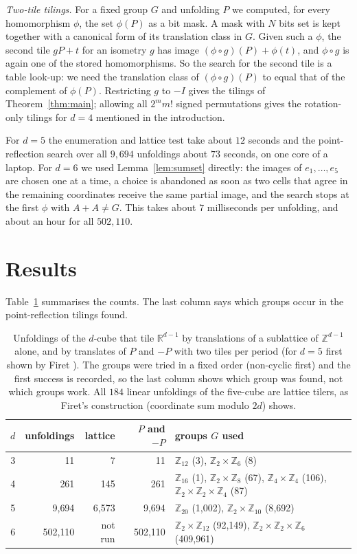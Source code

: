 \documentclass[11pt]{amsart}
\theoremstyle{definition}
\theoremstyle{remark}
\newcommand{\Z}{\mathbb{Z}}
\newcommand{\R}{\mathbb{R}}
\begin{document}
\emph{Two-tile tilings.} For a fixed group $G$ and unfolding $P$ we computed, for every homomorphism $\phi$, the set $\phi(P)$ as a bit mask. A mask with $N$ bits set is kept together with a canonical form of its translation class in $G$. Given such a $\phi$, the second tile $gP+t$ for an isometry $g$ has image $(\phi\circ g)(P)+\phi(t)$, and $\phi\circ g$ is again one of the stored homomorphisms. So the search for the second tile is a table look-up: we need the translation class of $(\phi\circ g)(P)$ to equal that of the complement of $\phi(P)$. Restricting $g$ to $-I$ gives the tilings of Theorem~\ref{thm:main}; allowing all $2^m m!$ signed permutations gives the rotation-only tilings for $d=4$ mentioned in the introduction.

For $d=5$ the enumeration and lattice test take about $12$ seconds and the point-reflection search over all $9{,}694$ unfoldings about $73$ seconds, on one core of a laptop. For $d=6$ we used Lemma~\ref{lem:sumset} directly: the images of $e_1,\dots,e_5$ are chosen one at a time, a choice is abandoned as soon as two cells that agree in the remaining coordinates receive the same partial image, and the search stops at the first $\phi$ with $A+A\ne G$. This takes about $7$ milliseconds per unfolding, and about an hour for all $502{,}110$.

\section{Results}\label{sec:results}

Table~\ref{tab:results} summarises the counts. The last column says which groups occur in the point-reflection tilings found.

\begin{table}[ht]
\centering\small
\begin{tabular}{rrrrp{5.2cm}}
\toprule
$d$ & unfoldings & lattice & $P$ and $-P$ & groups $G$ used\\
\midrule
3 & 11 & 7 & 11 & $\Z_{12}$ (3), $\Z_2\times\Z_6$ (8)\\
4 & 261 & 145 & 261 & $\Z_{16}$ (1), $\Z_2\times\Z_8$ (67), $\Z_4\times\Z_4$ (106), $\Z_2\times\Z_2\times\Z_4$ (87)\\
5 & 9{,}694 & 6{,}573 & 9{,}694 & $\Z_{20}$ (1{,}002), $\Z_2\times\Z_{10}$ (8{,}692)\\
6 & 502{,}110 & not run & 502{,}110 & $\Z_2\times\Z_{12}$ (92{,}149), $\Z_2\times\Z_2\times\Z_6$ (409{,}961)\\
\bottomrule
\end{tabular}
\caption{Unfoldings of the $d$-cube that tile $\R^{d-1}$ by translations of a sublattice of $\Z^{d-1}$ alone, and by translates of $P$ and $-P$ with two tiles per period (for $d=5$ first shown by Firet \cite{Firet}). The groups were tried in a fixed order (non-cyclic first) and the first success is recorded, so the last column shows which group was found, not which groups work. All $184$ linear unfoldings of the five-cube are lattice tilers, as Firet's construction (coordinate sum modulo $2d$) shows.}
\label{tab:results}
\end{table}
\end{document}
